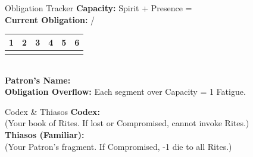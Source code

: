 \documentclass[10pt]{article}
\begin{document}
\begin{minipage}[t]{0.48\linewidth}
    \vspace{0.5em}
    
    \begin{charbox}{Obligation Tracker}
        \textbf{Capacity:} Spirit \underline{\hspace{1cm}} + Presence \underline{\hspace{1cm}} = \underline{\hspace{1.5cm}}\\
        \textbf{Current Obligation:} \underline{\hspace{1cm}} / \underline{\hspace{1.5cm}}\\
        \begin{tabular}{|p{1cm}|p{1cm}|p{1cm}|p{1cm}|p{1cm}|p{1cm}|}
            \hline
            1 & 2 & 3 & 4 & 5 & 6 \\
            \hline
            \multicolumn{6}{c}{\underline{\hspace{6cm}}} \\
        \end{tabular}\\
        \textbf{Patron's Name:} \underline{\hspace{4cm}}\\
        \textbf{Obligation Overflow:} Each segment over Capacity = 1 Fatigue.
    \end{charbox}
    
    \vspace{0.5em}
    
    \begin{charbox}{Codex \& Thiasos}
        \textbf{Codex:} \underline{\hspace{6cm}}\\
        (Your book of Rites. If lost or Compromised, cannot invoke Rites.)\\
        \textbf{Thiasos (Familiar):} \underline{\hspace{6cm}}\\
        (Your Patron's fragment. If Compromised, -1 die to all Rites.)
    \end{charbox}
\end{minipage}
\hfill
\end{document}
